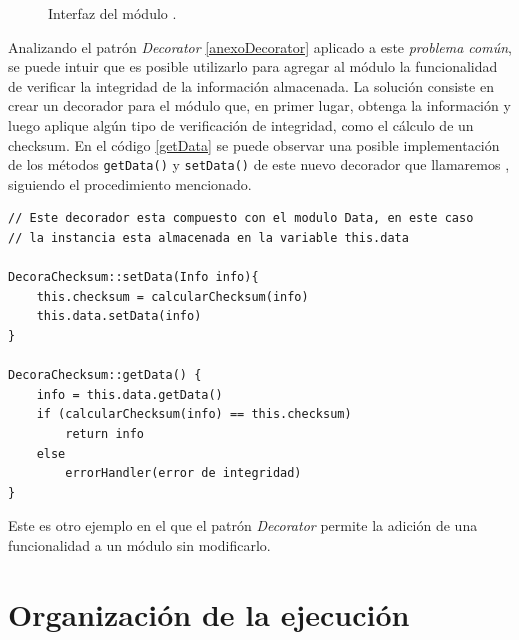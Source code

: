 \begin{figure}[H]
\caption{Interfaz del módulo \Data.}
\label{dataInter}
\begin{center}
\end{center}
\end{figure}

Analizando el patrón \textit{Decorator} \ref{anexoDecorator} aplicado a este \textit{problema común}, se puede intuir que es posible utilizarlo para agregar al módulo \Data la funcionalidad de verificar la integridad de la información almacenada. La solución consiste en crear un decorador para el módulo \Data que, en primer lugar, obtenga la información y luego aplique algún tipo de verificación de integridad, como el cálculo de un \gls{checksum}. En el código \ref{getData} se puede observar una posible implementación de los métodos \verb|getData()| y \verb|setData()| de este nuevo decorador que llamaremos \DecoraChecksum, siguiendo el procedimiento mencionado.

\begin{lstlisting}[caption=Implementación de los métodos getData y setData del decorador que se encarga de verificar la integridad de la información almacenada en el módulo \Data.,label={getData}]
// Este decorador esta compuesto con el modulo Data, en este caso
// la instancia esta almacenada en la variable this.data

DecoraChecksum::setData(Info info){
    this.checksum = calcularChecksum(info)
    this.data.setData(info)
}

DecoraChecksum::getData() {
    info = this.data.getData()
    if (calcularChecksum(info) == this.checksum)
        return info
    else
        errorHandler(error de integridad)
}
\end{lstlisting}

Este es otro ejemplo en el que el patrón \textit{Decorator} permite la adición de una funcionalidad a un módulo sin modificarlo.


\section{Organización de la ejecución}
\label{orgEjecucion}

